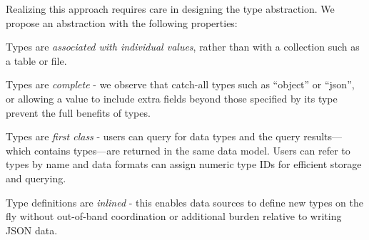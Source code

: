 
Realizing this approach requires care in designing the type abstraction. We propose an abstraction with the following properties:
\begin{CompactItemize}
    \item Types are {\em associated with individual values}, rather than with a collection such as a table or file.
    \item Types are {\em complete} - we observe that catch-all types such as ``object'' or ``json'', or allowing a value to include extra fields beyond those specified by its type prevent the full benefits of types.
    \item Types are {\em first class} - users can query for data types and the query results---which contains types---are returned in the same data model. Users can refer to types by name and data formats can assign numeric type IDs for efficient storage and querying.
    \item Type definitions are {\em inlined} - this enables data sources to define new types on the fly without out-of-band coordination or additional burden relative to writing JSON data.
\end{CompactItemize}

